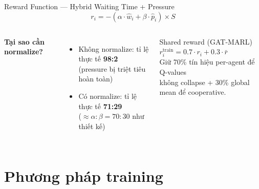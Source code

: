 \documentclass[aspectratio=169]{beamer}
\begin{document}
\begin{frame}{Reward Function — Hybrid Waiting Time + Pressure}
  \begin{equation*}
    r_i = -\!\left(\alpha \cdot \hat{w}_i + \beta \cdot \hat{p}_i\right) \times S
  \end{equation*}

  \vspace{0.3em}
  \begin{columns}
      \textbf{Tại sao cần normalize?}
      \begin{itemize}
        \item Không normalize: tỉ lệ thực tế \textbf{98:2}\\
              (pressure bị triệt tiêu hoàn toàn)
        \item Có normalize: tỉ lệ thực tế \textbf{71:29}\\
              ($\approx \alpha{:}\beta = 70{:}30$ như thiết kế)
      \end{itemize}

      \begin{block}{Shared reward (GAT-MARL)}
        $r_i^{\text{train}} = 0.7\cdot r_i + 0.3\cdot \bar{r}$\\[0.3em]
        \small Giữ 70\% tín hiệu per-agent để Q-values\\
        không collapse + 30\% global mean để cooperative.
      \end{block}
  \end{columns}

\end{frame}

\section{Phương pháp training}
\end{document}
